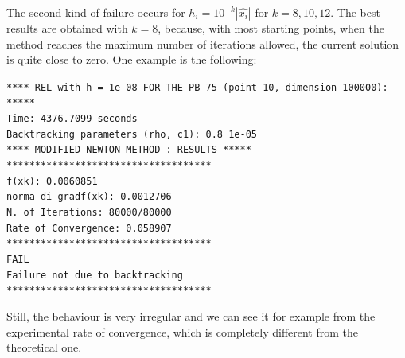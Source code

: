 The second kind of failure occurs for $h_i=10^{-k}|\hat{x_i}|$ for $k=8, 10, 12$. The best results are obtained with $k=8$, because, with most starting points, 
when the method reaches the maximum number of iterations allowed, the current solution is quite close to zero. One example is the following:
\begin{list}{}{\setlength{\leftmargin}{0.7cm}}
    \item \texttt{**** REL with h = 1e-08 FOR THE PB 75 (point 10, dimension 100000):  *****\\
    Time: 4376.7099 seconds\\
    Backtracking parameters (rho, c1): 0.8 1e-05\\
    **** MODIFIED NEWTON METHOD : RESULTS *****\\
    ************************************\\
    f(xk): 0.0060851\\
    norma di gradf(xk): 0.0012706\\
    N. of Iterations: 80000/80000\\
    Rate of Convergence: 0.058907\\
    ************************************\\
    FAIL\\
    Failure not due to backtracking\\
    ************************************\\
    }
\end{list}
Still, the behaviour is very irregular and we can see it for example from the experimental rate of convergence, which is completely
different from the theoretical one.

